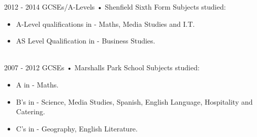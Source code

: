 
\begin{experiences}
  \educationexperience
    {2012 - 2014} {GCSEs/A-Levels • Shenfield Sixth Form}
    {Subjects studied:}
    {\begin{itemize}
      \item A-Level qualifications in - Maths, Media Studies and I.T.
      \item AS Level Qualification in - Business Studies.
    \end{itemize}}

  \\


  \educationexperience
    {2007 - 2012} {GCSEs • Marshalls Park School}
    {Subjects studied:}
    {\begin{itemize}
      \item A in - Maths.
      \item B's in - Science, Media Studies, Spanish, English Language, Hospitality
        and Catering.
      \item C's in - Geography, English Literature.
    \end{itemize}}
\end{experiences}
